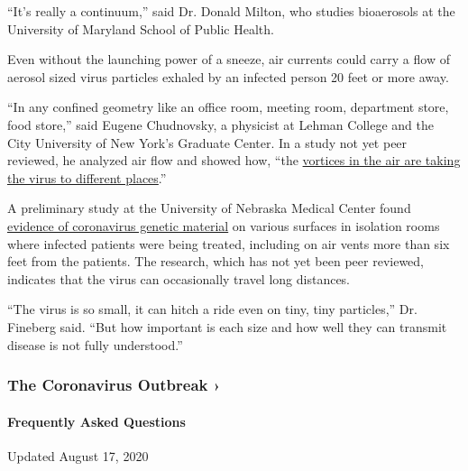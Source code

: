 ``It's really a continuum,'' said Dr. Donald Milton, who studies
bioaerosols at the University of Maryland School of Public Health.

Even without the launching power of a sneeze, air currents could carry a
flow of aerosol sized virus particles exhaled by an infected person 20
feet or more away.

``In any confined geometry like an office room, meeting room, department
store, food store,'' said Eugene Chudnovsky, a physicist at Lehman
College and the City University of New York's Graduate Center. In a
study not yet peer reviewed, he analyzed air flow and showed how, ``the
\href{https://arxiv.org/abs/2003.13689}{vortices in the air are taking
the virus to different places}.''

A preliminary study at the University of Nebraska Medical Center found
\href{https://www.medrxiv.org/content/10.1101/2020.03.23.20039446v2}{evidence
of coronavirus genetic material} on various surfaces in isolation rooms
where infected patients were being treated, including on air vents more
than six feet from the patients. The research, which has not yet been
peer reviewed, indicates that the virus can occasionally travel long
distances.

``The virus is so small, it can hitch a ride even on tiny, tiny
particles,'' Dr. Fineberg said. ``But how important is each size and how
well they can transmit disease is not fully understood.''

\href{https://www.nytimes.com/news-event/coronavirus?action=click\&pgtype=Article\&state=default\&region=MAIN_CONTENT_3\&context=storylines_faq}{}

\hypertarget{the-coronavirus-outbreak-}{%
\subsubsection{The Coronavirus Outbreak
›}\label{the-coronavirus-outbreak-}}

\hypertarget{frequently-asked-questions}{%
\paragraph{Frequently Asked
Questions}\label{frequently-asked-questions}}

Updated August 17, 2020

